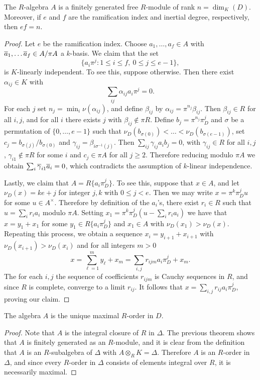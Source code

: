 \begin{thm}
The $R$-algebra $A$ is a finitely generated free $R$-module of rank $n = \dim_K(D)$.  Moreover, if $e$ and $f$ are the ramification index and inertial degree, respectively, then $ef = n$.
\end{thm}
\begin{proof}
Let $e$ be the ramification index.  Choose $a_1,\dots, a_f\in A$ with $\overline{a}_1,\dots \overline{a}_f\in A/\pi A$ a $k$-basis.  We claim that the set
$$\{a_i\pi^j: 1\leq i\leq f,\ 0\leq j\leq e-1\},$$
is $K$-linearly independent.  To see this, suppose otherwise.  Then there exist $\alpha_{ij}\in K$ with
$$\sum_{ij}\alpha_{ij}a_i\pi^j = 0.$$
For each $j$ set $n_j = \min_i\nu(\alpha_{ij})$, and define $\beta_{ij}$ by $\alpha_{ij} = \pi^{n_j}\beta_{ij}$.  Then $\beta_{ij}\in R$ for all $i,j$, and for all $i$ there exists $j$ with $\beta_{ij}\notin\pi R$.  Define $b_j = \pi^{n_j}\pi_D^j$ and $\sigma$ be a permutation of $\{0,\dots, e-1\}$ such that $\nu_D(b_{\sigma(0)}) < \dots <\nu_D(b_{\sigma(e-1)})$, set $c_j = b_{\sigma(j)}/b_{\sigma(0)}$ and $\gamma_{ij} = \beta_{i\sigma^{-1}(j)}$.  Then $\sum_{ij}\gamma_{ij}a_ib_j=0$, with $\gamma_{ij}\in R$ for all $i,j$, $\gamma_{i1}\notin\pi R$ for some $i$ and $c_j\in \pi A$ for all $j\geq 2$.  Therefore reducing modulo $\pi A$ we obtain $\sum_{i}\overline{\gamma}_{i1}\overline{a}_i = 0$, which contradicts the assumption of $k$-linear independence.

Lastly, we claim that $A = R\{a_i\pi_D^j\}$.  To see this, suppose that $x\in A$, and let $\nu_D(x) = ke + j$ for integer $j,k$ with $0\leq j < e$.  Then we may write $x = \pi^k\pi_D^ju$ for some $u\in A^\times$.  Therefore by definition of the $a_i$'s, there exist $r_i\in R$ such that $u = \sum_i r_ia_i$ modulo $\pi A$.  Setting $x_1 = \pi^k\pi_D^j(u-\sum_i r_ia_i)$ we have that $x = y_1 + x_1$ for some $y_1\in R\{a_i\pi_D^j\}$ and $x_1\in A$ with $\nu_D(x_1)>\nu_D(x)$.  Repeating this process, we obtain a sequence $x_i = y_{i+1}+x_{i+1}$ with $\nu_D(x_{i+1})>\nu_D(x_i)$ and for all integers $m>0$
$$x = \sum_{\ell=1}^m y_\ell + x_m = \sum_{i,j}r_{ijm}a_i\pi_D^j + x_m.$$
The for each $i,j$ the sequence of coefficients $r_{ijm}$ is Cauchy sequences in $R$, and since $R$ is complete, converge to a limit $r_{ij}$.  It follows that $x = \sum_{i,j}r_{ij}a_i\pi_D^j$, proving our claim.
\end{proof}

\begin{cor}
The algebra $A$ is the unique maximal $R$-order in $D$.
\end{cor}
\begin{proof}
Note that $A$ is the integral closure of $R$ in $\Delta$.  The previous theorem shows that $A$ is finitely generated as an $R$-module, and it is clear from the definition that $A$ is an $R$-subalgebra of $\Delta$ with $A\otimes_RK=\Delta$.  Therefore $A$ is an $R$-order in $\Delta$, and since every $R$-order in $\Delta$ consists of elements integral over $R$, it is necessarily maximal.
\end{proof}

